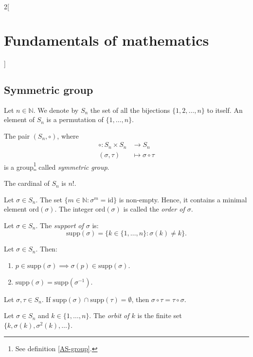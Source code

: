 \documentclass[../../../main.tex]{subfiles}
\begin{document}
\begin{multicols}{2}[\section{Fundamentals of mathematics}]
\subsection{Symmetric group}
\begin{definition}
    Let $n\in\mathbb{N}$. We denote by $S_n$ the set of all the bijections $\{1,2,\ldots,n\}$ to itself. An element of $S_n$ is a permutation of $\{1,\ldots,n\}$.
\end{definition}
\begin{prop}
    The pair $(S_n,\circ)$, where 
    \begin{align*}
        \circ:S_n\times S_n&\longrightarrow S_n\\
        (\sigma,\tau)&\longmapsto\sigma\circ\tau
    \end{align*}
    is a group\footnote{See definition \ref{AS-group}.} called \textit{symmetric group}.
\end{prop}
\begin{theorem}
    The cardinal of $S_n$ is $n!$.
\end{theorem}
\begin{definition}
    Let $\sigma\in S_n$. The set $\{m\in\mathbb{N}:\sigma^m=\text{id}\}$ is non-empty. Hence, it contains a minimal element $\text{ord}(\sigma)$. The integer $\text{ord}(\sigma)$ is called the \textit{order of $\sigma$}.
\end{definition}
\begin{definition}
    Let $\sigma\in S_n$. The \textit{support of $\sigma$} is: $$\text{supp}(\sigma)=\{k\in\{1,\ldots,n\}: \sigma(k)\ne k\}.$$
\end{definition}
\begin{lemma}
    Let $\sigma\in S_n$. Then:
    \begin{enumerate}
        \item $p\in\text{supp}(\sigma)\implies \sigma(p)\in\text{supp}(\sigma)$.
        \item $\text{supp}(\sigma)=\text{supp}(\sigma^{-1})$.
    \end{enumerate}
\end{lemma}
\begin{lemma}
    Let $\sigma,\tau\in S_n$. If $\text{supp}(\sigma)\cap\text{supp}(\tau)=\emptyset$, then $\sigma\circ \tau=\tau\circ \sigma$.
\end{lemma}
\begin{definition}
    Let $\sigma\in S_n$ and $k\in\{1,\ldots,n\}$. The \textit{orbit of $k$} is the finite set $\{k,\sigma(k),\sigma^2(k),\ldots\}$.
\end{definition}

\end{multicols}
\end{document}
